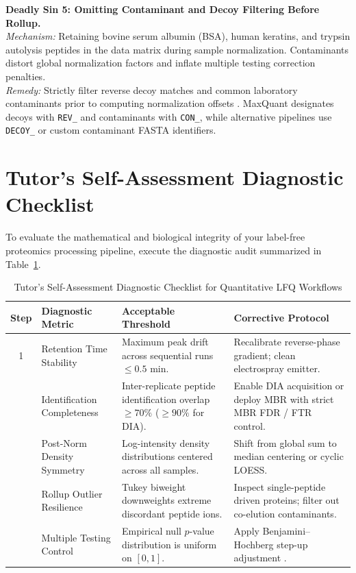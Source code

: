 \documentclass[11pt,oneside]{book}
\begin{document}
\begin{pitfallbox}[top=4pt, bottom=4pt, before skip=3pt, after skip=3pt]
\textbf{Deadly Sin 5: Omitting Contaminant and Decoy Filtering Before Rollup.}\\
\textit{Mechanism:} Retaining bovine serum albumin (BSA), human keratins, and trypsin autolysis peptides in the data matrix during sample normalization. Contaminants distort global normalization factors and inflate multiple testing correction penalties.\\
\textit{Remedy:} Strictly filter reverse decoy matches and common laboratory contaminants prior to computing normalization offsets \cite{cox2008maxquant}. MaxQuant designates decoys with \texttt{REV\_} and contaminants with \texttt{CON\_}, while alternative pipelines use \texttt{DECOY\_} or custom contaminant FASTA identifiers.
\end{pitfallbox}

\clearpage
\section{Tutor's Self-Assessment Diagnostic Checklist}
\enlargethispage{2.5\baselineskip}

To evaluate the mathematical and biological integrity of your label-free proteomics processing pipeline, execute the diagnostic audit summarized in Table~\ref{tab:lfq_checklist}.

\begin{table}[ht]
\centering
\caption{Tutor's Self-Assessment Diagnostic Checklist for Quantitative LFQ Workflows}
\label{tab:lfq_checklist}
\small
\begin{tabularx}{\textwidth}{c p{4.2cm} p{4.5cm} X}
\toprule
\textbf{Step} & \textbf{Diagnostic Metric} & \textbf{Acceptable Threshold} & \textbf{Corrective Protocol} \\
\midrule
1 & Retention Time Stability & Maximum peak drift across sequential runs $\le 0.5$ min. & Recalibrate reverse-phase gradient; clean electrospray emitter. \\
\addlinespace
2 & Identification Completeness & Inter-replicate peptide identification overlap $\ge 70\%$ ($\ge 90\%$ for DIA). & Enable DIA acquisition or deploy MBR with strict MBR FDR / FTR control. \\
\addlinespace
3 & Post-Norm Density Symmetry & Log-intensity density distributions centered across all samples. & Shift from global sum to median centering or cyclic LOESS. \\
\addlinespace
4 & Rollup Outlier Resilience & Tukey biweight downweights extreme discordant peptide ions. & Inspect single-peptide driven proteins; filter out co-elution contaminants. \\
\addlinespace
5 & Multiple Testing Control & Empirical null $p$-value distribution is uniform on $[0, 1]$. & Apply Benjamini--Hochberg step-up adjustment \cite{benjamini1995controlling}. \\
\bottomrule
\end{tabularx}
\end{table}
\end{document}
